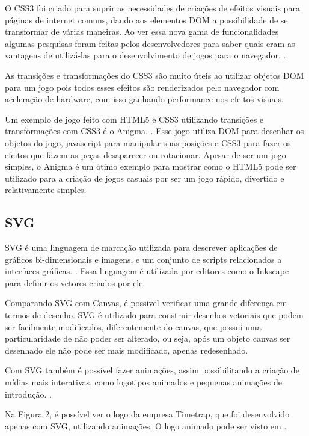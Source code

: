 O CSS3 foi criado para suprir as necessidades de criações de efeitos
visuais para páginas de internet comuns, dando aos elementos DOM a
possibilidade de se transformar de várias maneiras. Ao ver essa nova
gama de funcionalidades algumas pesquisas foram feitas pelos
desenvolvedores para saber quais eram as vantagens de utilizá-las para
o desenvolvimento de jogos para o navegador. \cite{agi2011html5}.

As transições e transformações do CSS3 são muito úteis ao utilizar
objetos DOM para um jogo pois todos esses efeitos são renderizados
pelo navegador com aceleração de hardware, com isso ganhando
performance nos efeitos visuais.

Um exemplo de jogo feito com HTML5 e CSS3 utilizando transições e
transformações com CSS3 é o Anigma. \cite{website:anigma}. Esse jogo
utiliza DOM para desenhar os objetos do jogo, javascript para
manipular suas posições e CSS3 para fazer os efeitos que fazem as
peças desaparecer ou rotacionar. Apesar de ser um jogo simples, o
Anigma é um ótimo exemplo para mostrar como o HTML5 pode ser utilizado
para a criação de jogos casuais por ser um jogo rápido, divertido e
relativamente simples.

\subsection{SVG}

SVG é uma linguagem de marcação utilizada para descrever aplicações de gráficos
bi-dimensionais e imagens, e um conjunto de scripts relacionados a
interfaces gráficas. \cite{website:w3csvg}. Essa linguagem é utilizada por
editores como o Inkscape para definir os vetores criados por ele.

Comparando SVG com Canvas, é possível verificar uma grande diferença
em termos de desenho. SVG é utilizado para construir desenhos
vetoriais que podem ser facilmente modificados, diferentemente do
canvas, que possui uma particularidade de não poder ser alterado, ou
seja, após um objeto canvas ser desenhado ele não pode ser mais
modificado, apenas redesenhado.

Com SVG também é possível fazer animações, assim possibilitando a
criação de mídias mais interativas, como logotipos animados e pequenas
animações de introdução. \cite{website:w3csvg}.

Na Figura 2, é possível ver o logo da empresa
Timetrap, que foi desenvolvido apenas com SVG, utilizando animações. O
logo animado pode ser visto em .

